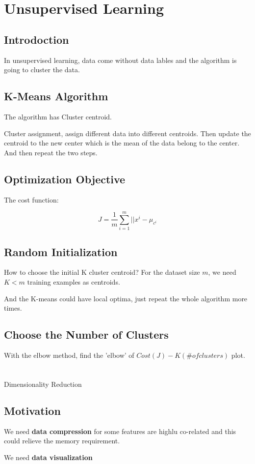\documentclass[en,11pt,english,black,simple]{../elegantbook}
\begin{document}
\fi 
\def\chapname{08unsupervised}

\chapter{Unsupervised Learning}

\section{Introdoction}

In unsupervised learning, data come without data lables and the algorithm is going to cluster the data. 

\section{K-Means Algorithm}

The algorithm has Cluster centroid. 

Cluster assignment, assign different data into different centroids. Then update the centroid to the new center which is the mean of the data belong to the center. And then repeat the two steps.  

\section{Optimization Objective}

The cost function: 

\[J = \frac{1}{m} \sum_{i=1}^m ||x^{i} - \mu _{c^i}\]

\section{Random Initialization}

How to choose the initial K cluster centroid? For the dataset size \(m\), we need \(K < m\) training examples as centroids. 

And the K-means could have local optima, just repeat the whole algorithm more times. 

\section{Choose the Number of Clusters}

With the elbow method, find the 'elbow' of \(Cost(J)-K(\# of clusters)\) plot.

\chapter{}{Dimensionality Reduction}

\section{Motivation}

We need \textbf{data compression} for some features are highlu co-related and this could relieve the memory requirement. 

We need \textbf{data visualization} 


\let\chapname\undefined
\ifx\mainclass\undefined
\end{document}
